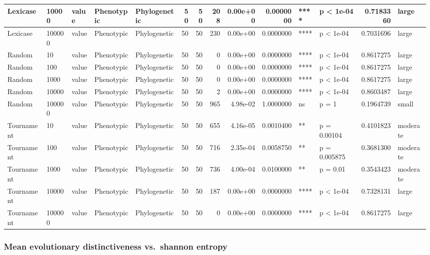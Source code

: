 \documentclass[]{book}
\begin{document}
\begin{table}
\begin{tabular}[t]{l|l|l|l|l|r|r|r|r|r|l|l|r|l}
\hline
Lexicase & 10000 & value & Phenotypic & Phylogenetic & 50 & 50 & 208 & 0.00e+00 & 0.0000000 & **** & p < 1e-04 & 0.7183360 & large\\
\hline
Lexicase & 100000 & value & Phenotypic & Phylogenetic & 50 & 50 & 230 & 0.00e+00 & 0.0000000 & **** & p < 1e-04 & 0.7031696 & large\\
\hline
Random & 10 & value & Phenotypic & Phylogenetic & 50 & 50 & 0 & 0.00e+00 & 0.0000000 & **** & p < 1e-04 & 0.8617275 & large\\
\hline
Random & 100 & value & Phenotypic & Phylogenetic & 50 & 50 & 0 & 0.00e+00 & 0.0000000 & **** & p < 1e-04 & 0.8617275 & large\\
\hline
Random & 1000 & value & Phenotypic & Phylogenetic & 50 & 50 & 0 & 0.00e+00 & 0.0000000 & **** & p < 1e-04 & 0.8617275 & large\\
\hline
Random & 10000 & value & Phenotypic & Phylogenetic & 50 & 50 & 2 & 0.00e+00 & 0.0000000 & **** & p < 1e-04 & 0.8603487 & large\\
\hline
Random & 100000 & value & Phenotypic & Phylogenetic & 50 & 50 & 965 & 4.98e-02 & 1.0000000 & ns & p = 1 & 0.1964739 & small\\
\hline
Tournament & 10 & value & Phenotypic & Phylogenetic & 50 & 50 & 655 & 4.16e-05 & 0.0010400 & ** & p = 0.00104 & 0.4101823 & moderate\\
\hline
Tournament & 100 & value & Phenotypic & Phylogenetic & 50 & 50 & 716 & 2.35e-04 & 0.0058750 & ** & p = 0.005875 & 0.3681300 & moderate\\
\hline
Tournament & 1000 & value & Phenotypic & Phylogenetic & 50 & 50 & 736 & 4.00e-04 & 0.0100000 & ** & p = 0.01 & 0.3543423 & moderate\\
\hline
Tournament & 10000 & value & Phenotypic & Phylogenetic & 50 & 50 & 187 & 0.00e+00 & 0.0000000 & **** & p < 1e-04 & 0.7328131 & large\\
\hline
Tournament & 100000 & value & Phenotypic & Phylogenetic & 50 & 50 & 0 & 0.00e+00 & 0.0000000 & **** & p < 1e-04 & 0.8617275 & large\\
\hline
\end{tabular}
\end{table}

\hypertarget{mean-evolutionary-distinctiveness-vs.shannon-entropy}{%
\subsubsection{Mean evolutionary distinctiveness vs.~shannon entropy}\label{mean-evolutionary-distinctiveness-vs.shannon-entropy}}
\end{document}
